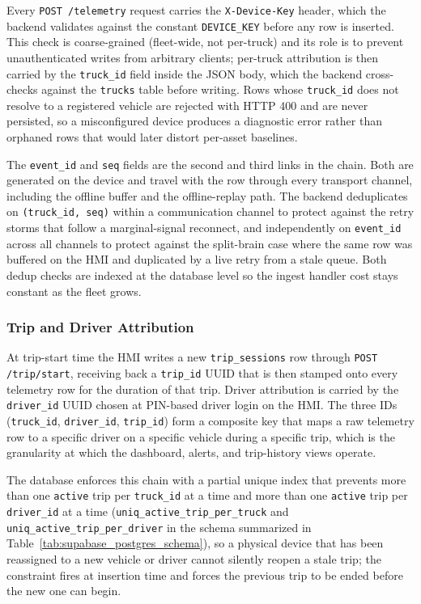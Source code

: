 Every \texttt{POST /telemetry} request carries the \texttt{X-Device-Key} header, which the backend validates against the constant \texttt{DEVICE\_KEY} before any row is inserted. This check is coarse-grained (fleet-wide, not per-truck) and its role is to prevent unauthenticated writes from arbitrary clients; per-truck attribution is then carried by the \texttt{truck\_id} field inside the JSON body, which the backend cross-checks against the \texttt{trucks} table before writing. Rows whose \texttt{truck\_id} does not resolve to a registered vehicle are rejected with HTTP 400 and are never persisted, so a misconfigured device produces a diagnostic error rather than orphaned rows that would later distort per-asset baselines.

The \texttt{event\_id} and \texttt{seq} fields are the second and third links in the chain. Both are generated on the device and travel with the row through every transport channel, including the offline buffer and the offline-replay path. The backend deduplicates on \texttt{(truck\_id, seq)} within a communication channel to protect against the retry storms that follow a marginal-signal reconnect, and independently on \texttt{event\_id} across all channels to protect against the split-brain case where the same row was buffered on the HMI and duplicated by a live retry from a stale queue. Both dedup checks are indexed at the database level so the ingest handler cost stays constant as the fleet grows.

\subsubsection{Trip and Driver Attribution}
\label{sec:unit_id_trip_driver}

At trip-start time the HMI writes a new \texttt{trip\_sessions} row through \texttt{POST /trip/start}, receiving back a \texttt{trip\_id} UUID that is then stamped onto every telemetry row for the duration of that trip. Driver attribution is carried by the \texttt{driver\_id} UUID chosen at PIN-based driver login on the HMI. The three IDs (\texttt{truck\_id}, \texttt{driver\_id}, \texttt{trip\_id}) form a composite key that maps a raw telemetry row to a specific driver on a specific vehicle during a specific trip, which is the granularity at which the dashboard, alerts, and trip-history views operate.

The database enforces this chain with a partial unique index that prevents more than one \texttt{active} trip per \texttt{truck\_id} at a time and more than one \texttt{active} trip per \texttt{driver\_id} at a time (\texttt{uniq\_active\_trip\_per\_truck} and \texttt{uniq\_active\_trip\_per\_driver} in the schema summarized in Table~\ref{tab:supabase_postgres_schema}), so a physical device that has been reassigned to a new vehicle or driver cannot silently reopen a stale trip; the constraint fires at insertion time and forces the previous trip to be ended before the new one can begin.

